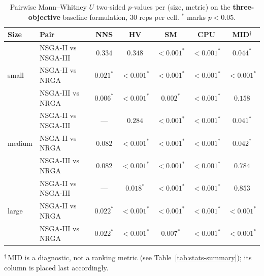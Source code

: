 \documentclass[applsci,article,submit,moreauthors,pdftex]{Definitions/mdpi}
\begin{document}
\begin{table}[!ht]
\centering\footnotesize
\caption{Pairwise Mann--Whitney $U$ two-sided $p$-values per
(size, metric) on the \textbf{three-objective} baseline formulation,
30 reps per cell. $^{*}$ marks $p<0.05$.}
\label{tab:appb-3obj}
\begin{tabular}{l l ccccc}
\toprule
Size & Pair & NNS & HV & SM & CPU & MID$^{\dagger}$ \\
\midrule
\multirow{3}{*}{small} & NSGA-II vs NSGA-III & $0.334$ & $0.348$ & $<0.001^{*}$ & $<0.001^{*}$ & $0.044^{*}$ \\
 & NSGA-II vs NRGA & $0.021^{*}$ & $<0.001^{*}$ & $<0.001^{*}$ & $<0.001^{*}$ & $<0.001^{*}$ \\
 & NSGA-III vs NRGA & $0.006^{*}$ & $<0.001^{*}$ & $0.002^{*}$ & $<0.001^{*}$ & $0.158$ \\
\midrule
\multirow{3}{*}{medium} & NSGA-II vs NSGA-III & --- & $0.284$ & $<0.001^{*}$ & $<0.001^{*}$ & $0.041^{*}$ \\
 & NSGA-II vs NRGA & $0.082$ & $<0.001^{*}$ & $<0.001^{*}$ & $<0.001^{*}$ & $0.042^{*}$ \\
 & NSGA-III vs NRGA & $0.082$ & $<0.001^{*}$ & $<0.001^{*}$ & $<0.001^{*}$ & $0.784$ \\
\midrule
\multirow{3}{*}{large} & NSGA-II vs NSGA-III & --- & $0.018^{*}$ & $<0.001^{*}$ & $<0.001^{*}$ & $0.853$ \\
 & NSGA-II vs NRGA & $0.022^{*}$ & $<0.001^{*}$ & $<0.001^{*}$ & $<0.001^{*}$ & $<0.001^{*}$ \\
 & NSGA-III vs NRGA & $0.022^{*}$ & $<0.001^{*}$ & $0.007^{*}$ & $<0.001^{*}$ & $<0.001^{*}$ \\
\bottomrule
\end{tabular}

\smallskip
{\footnotesize $^{\dagger}$\,MID is a diagnostic, not a ranking metric
(see Table~\ref{tab:stats-summary}); its column is placed last accordingly.}
\end{table}


\end{document}
